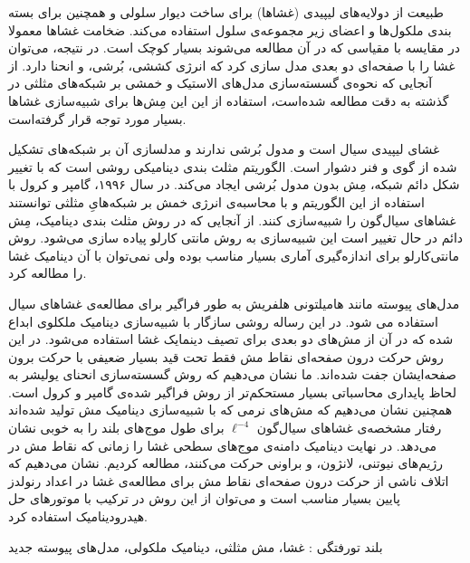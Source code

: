 


طبیعت از دولایه‌های لیپیدی (غشاها) برای ساخت دیوار سلولی و همچنین برای بسته بندی ملکول‌ها و اعضای زیر مجموعه‌ی سلول استفاده می‌کند. ضخامت غشا‌ها معمولا در مقایسه با مقیاسی که در آن مطالعه می‌شوند بسیار کوچک است. در نتیجه، می‌توان غشا را با صفحه‌ای دو بعدی مدل سازی کرد که انرژی کششی، بُرشی، و انحنا دارد. از آنجایی که نحوه‌ی گسسته‌سازی مدل‌های الاستیک و خمشی بر شبکه‌های مثلثی در گذشته به دقت مطالعه شده‌است، استفاده از این این مِش‌ها برای شبیه‌سازی غشا‌ها بسیار مورد توجه قرار گرفته‌است.

غشای لیپیدی سیال است و مدول بُرشی ندارند و مدلسازی آن‌ بر شبکه‌های تشکیل شده از گوی و فنر دشوار است. الگوریتم مثلث بندی دینامیکی روشی است که با تغییر شکل دائم شبکه‌، مِش بدون مدول بُرشی ایجاد می‌کند. در سال ۱۹۹۶، گامپر و کرول با استفاده از این الگوریتم و با محاسبه‌ی انرژی خمش بر شبکه‌هایِ مثلثی توانستند غشا‌های سیال‌گون را شبیه‌سازی کنند. از آنجایی که در روش مثلث‌ بندی دینامیک، مِش دائم در حال تغییر است این شبیه‌سازی به روش مانتی کارلو پیاده سازی می‌شود. روش مانتی‌کارلو برای اندازه‌گیری آماری بسیار مناسب بوده ولی نمی‌توان با آن دینامیک غشا را مطالعه کرد. 

مدل‌های پیوسته مانند هامیلتونی هلفریش به طور فراگیر برای مطالعه‌ی غشاهای سیال استفاده می شود. در این رساله روشی  سازگار با شبیه‌سازی دینامیک ملکلوی ابداع شده که در آن از مش‌های دو بعدی برای تصیف دینمایک غشا استفاده می‌شود. در این روش حرکت درون صفحه‌ای نقاط مش فقط تحت قید بسیار ضعیفی با حرکت برون صفحه‌ایشان جفت شده‌اند. ما نشان می‌دهیم که روش گسسته‌سازی انحنای یولیشر به لحاظ پایداری محاسباتی بسیار مستحکم‌تر از روش فراگیر شده‌ی گامپر و کرول است. همچنین نشان می‌دهیم که  مش‌های نرمی که  با شبیه‌سازی دینامیک مش تولید شده‌اند رفتار مشخصه‌ی غشا‌های سیال‌گون 
$\ell^{-4}$
برای طول موج‌های بلند را به خوبی نشان می‌دهد. در نهایت دینامیک دامنه‌ی موج‌های سطحی غشا را زمانی که نقاط مش در رژیم‌های نیوتنی، لانژون، و براونی حرکت می‌کنند، مطالعه کردیم. نشان می‌دهیم که اتلاف ناشی از حرکت درون صفحه‌ای نقاط مش برای مطالعه‌ی غشا در اعداد رنولدز پایین بسیار مناسب است و می‌توان از این روش در ترکیب با موتور‌های حل هیدرودینامیک استفاده کرد.





‌بلند
‌تورفتگی : 
غشا، مش مثلثی، دینامیک ملکولی، مدل‌های پیوسته
‌جدید
